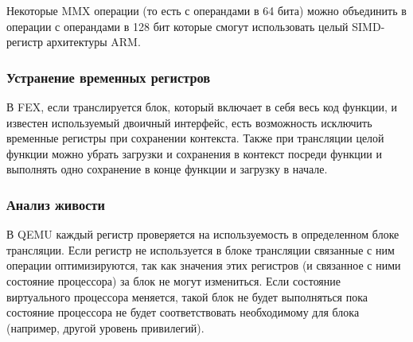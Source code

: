 Некоторые MMX операции (то есть с операндами в 64 бита) можно объединить в операции с операндами в 128 бит которые смогут использовать целый SIMD-регистр архитектуры ARM.

\subsubsection{Устранение временных регистров}

В FEX, если транслируется блок, который включает в себя весь код функции, и известен используемый двоичный интерфейс, есть возможность исключить временные регистры при сохранении контекста. Также при трансляции целой функции можно убрать загрузки и сохранения в контекст посреди функции и выполнять одно сохранение в конце функции и загрузку в начале.

\subsubsection{Анализ живости}

В QEMU каждый регистр проверяется на используемость в определенном блоке трансляции. Если регистр не используется в блоке трансляции связанные с ним операции оптимизируются, так как значения этих регистров (и связанное с ними состояние процессора) за блок не могут измениться. Если состояние виртуального процессора меняется, такой блок не будет выполняться пока состояние процессора не будет соответствовать необходимому для блока (например, другой уровень привилегий).

